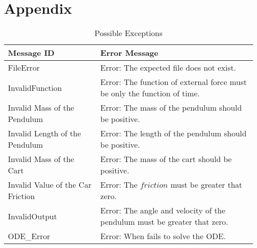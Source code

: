\documentclass[12pt, titlepage]{article}
\begin{document}
\section{Appendix} \label{Appendix}
\begin{longtable}{l p{12cm}}
\caption{Possible Exceptions} \\
\toprule
\textbf{Message ID} & \textbf{Error Message} \\
\midrule
FileError & Error: The expected file does not exist. \\
InvalidFunction & Error: The function of external force must be only the function of time.\\
Invalid Mass of the Pendulum& Error: The mass of the pendulum should be positive.\\
Invalid Length of the Pendulum&Error: The length of the pendulum should be positive. \\
Invalid Mass of the Cart&Error: The mass of the cart should be positive.\\
Invalid Value of the Car Friction&Error: The $friction$ must be greater that zero.\\
InvalidOutput& Error: The angle and velocity of the pendulum must be greater that zero.\\
ODE\_Error&Error: When fails to solve the ODE.\\
\bottomrule
\end{longtable}
\end{document}
